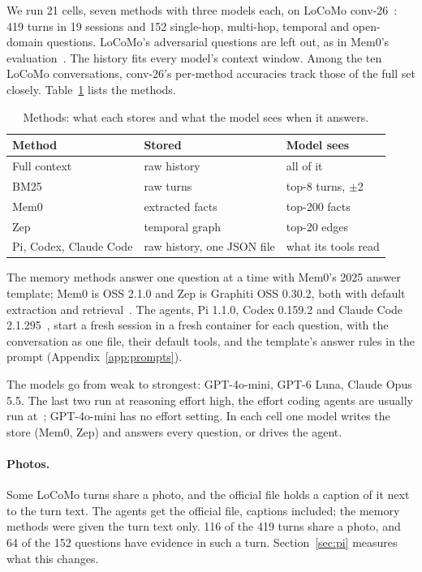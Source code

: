 \documentclass[11pt]{article}
\begin{document}
We run 21 cells, seven methods with three models each, on LoCoMo conv-26~\citep{maharana2024locomo}: 419 turns in 19 sessions and 152 single-hop, multi-hop, temporal and open-domain questions. LoCoMo's adversarial questions are left out, as in Mem0's evaluation~\citep{chhikara2025mem0}. The history fits every model's context window. Among the ten LoCoMo conversations, conv-26's per-method accuracies track those of the full set closely. Table~\ref{tab:methods} lists the methods.

\begin{table}[t]
\centering
\caption{Methods: what each stores and what the model sees when it answers.}
\label{tab:methods}
\small
\begin{tabular}{@{}lll@{}}
\toprule
\textbf{Method} & \textbf{Stored} & \textbf{Model sees} \\
\midrule
Full context & raw history & all of it \\
BM25 & raw turns & top-8 turns, $\pm$2 \\
Mem0 & extracted facts & top-200 facts \\
Zep & temporal graph & top-20 edges \\
Pi, Codex, Claude Code & raw history, one JSON file & what its tools read \\
\bottomrule
\end{tabular}
\end{table}

The memory methods answer one question at a time with Mem0's 2025 answer template; Mem0 is OSS 2.1.0 and Zep is Graphiti OSS 0.30.2, both with default extraction and retrieval~\citep{chhikara2025mem0,rasmussen2025zep}. The agents, Pi 1.1.0, Codex 0.159.2 and Claude Code 2.1.295~\citep{pi2026,codex2026,claudecode2026}, start a fresh session in a fresh container for each question, with the conversation as one file, their default tools, and the template's answer rules in the prompt (Appendix~\ref{app:prompts}).

The models go from weak to strongest: GPT-4o-mini, GPT-6 Luna, Claude Opus 5.5. The last two run at reasoning effort high, the effort coding agents are usually run at~\citep{arena2026harnesstax}; GPT-4o-mini has no effort setting. In each cell one model writes the store (Mem0, Zep) and answers every question, or drives the agent.

\paragraph{Photos.} Some LoCoMo turns share a photo, and the official file holds a caption of it next to the turn text. The agents get the official file, captions included; the memory methods were given the turn text only. 116 of the 419 turns share a photo, and 64 of the 152 questions have evidence in such a turn. Section~\ref{sec:pi} measures what this changes.
\end{document}
